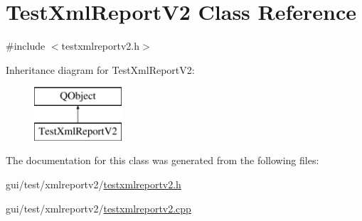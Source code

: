 \hypertarget{class_test_xml_report_v2}{\section{Test\-Xml\-Report\-V2 Class Reference}
\label{class_test_xml_report_v2}
}


{\ttfamily \#include $<$testxmlreportv2.\-h$>$}

Inheritance diagram for Test\-Xml\-Report\-V2\-:\begin{figure}[H]
\begin{center}
\leavevmode
\includegraphics[height=2.000000cm]{class_test_xml_report_v2}
\end{center}
\end{figure}


The documentation for this class was generated from the following files\-:\begin{DoxyCompactItemize}
\item 
gui/test/xmlreportv2/\hyperlink{testxmlreportv2_8h}{testxmlreportv2.\-h}\item 
gui/test/xmlreportv2/\hyperlink{testxmlreportv2_8cpp}{testxmlreportv2.\-cpp}\end{DoxyCompactItemize}
